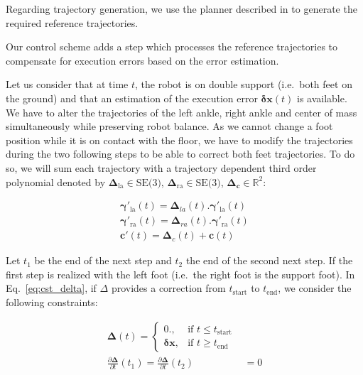 Regarding trajectory generation, we use the planner described in
\cite{Dalibard11humanoids} to generate the required reference
trajectories.

Our control scheme adds a step which processes the reference
trajectories to compensate for execution errors based on the error
estimation.

Let us consider that at time $t$, the robot is on double support
(i.e.\ both feet on the ground) and that an estimation of the
execution error $\mathbf{\delta \mathbf{x}}(t)$ is available. We have
to alter the trajectories of the left ankle, right ankle and center of
mass simultaneously while preserving robot balance. As we cannot
change a foot position while it is on contact with the floor, we have
to modify the trajectories during the two following steps to be able
to correct both feet trajectories. To do so, we will sum each
trajectory with a trajectory dependent third order polynomial denoted
by $\mathbf{\Delta}_{\text{la}} \in \text{SE(3)}$,
$\mathbf{\Delta}_{\text{ra}} \in \text{SE(3)}$,
$\mathbf{\Delta}_{\mathbf{c}} \in \mathbb{R}^2$:

\begin{equation}
  \begin{aligned}
    \mathbf{\gamma}'_{\text{la}}(t) = \mathbf{\Delta}_{la}(t) . \mathbf{\gamma}'_{\text{la}}(t)\\
    \mathbf{\gamma}'_{\text{ra}}(t) = \mathbf{\Delta}_{ra}(t) . \mathbf{\gamma}'_{\text{ra}}(t)\\
    \mathbf{c}'(t) = \mathbf{\Delta}_{c}(t) + \mathbf{c}(t)
  \end{aligned}
  \label{eq:cst_delta}
\end{equation}

Let $t_1$ be the end of the next step and $t_2$ the end of the second
next step. If the first step is realized with the left foot (i.e.\ the
right foot is the support foot). In Eq.~\ref{eq:cst_delta}, if
$\Delta$ provides a correction from $t_{\text{start}}$ to
$t_{\text{end}}$, we consider the following constraints:

\begin{equation}
\begin{aligned}
  \mathbf{\Delta}(t) =
  \begin{cases}
    0.,  & \mbox{if }t\mbox{$\leq t_{\text{start}}$} \\
    \mathbf{\delta x}, & \mbox{if }t\mbox{$\geq t_{\text{end}}$}
  \end{cases}\\
  \frac{\partial \mathbf{\Delta}}{\partial t}(t_1) = \frac{\partial
    \mathbf{\Delta}}{\partial t}(t_2) &= 0
\end{aligned}
\label{eq:deltaConstraints}
\end{equation}

